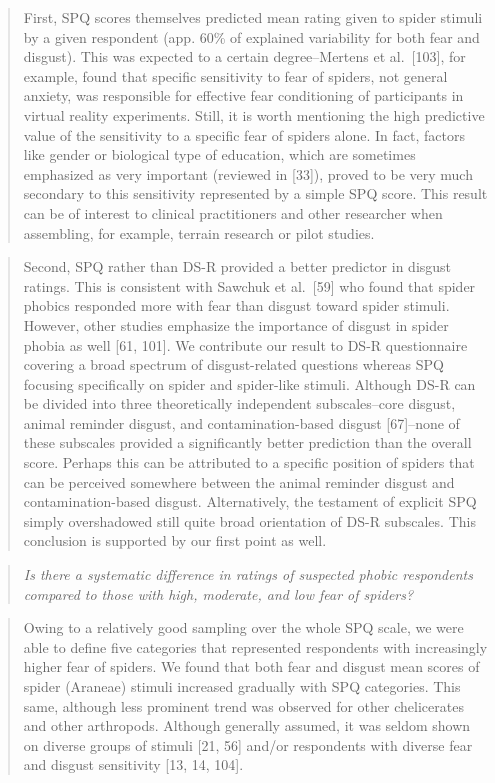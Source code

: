 \documentclass[
]{book}
\begin{document}
\begin{quote}
First, SPQ scores themselves predicted mean rating given to spider stimuli by a given respondent (app. 60\% of explained variability for both fear and disgust). This was expected to a certain degree--Mertens et al.~{[}103{]}, for example, found that specific sensitivity to fear of spiders, not general anxiety, was responsible for effective fear conditioning of participants in virtual reality experiments. Still, it is worth mentioning the high predictive value of the sensitivity to a specific fear of spiders alone. In fact, factors like gender or biological type of education, which are sometimes emphasized as very important (reviewed in {[}33{]}), proved to be very much secondary to this sensitivity represented by a simple SPQ score. This result can be of interest to clinical practitioners and other researcher when assembling, for example, terrain research or pilot studies.
\end{quote}

\begin{quote}
Second, SPQ rather than DS-R provided a better predictor in disgust ratings. This is consistent with Sawchuk et al.~{[}59{]} who found that spider phobics responded more with fear than disgust toward spider stimuli. However, other studies emphasize the importance of disgust in spider phobia as well {[}61, 101{]}. We contribute our result to DS-R questionnaire covering a broad spectrum of disgust-related questions whereas SPQ focusing specifically on spider and spider-like stimuli. Although DS-R can be divided into three theoretically independent subscales--core disgust, animal reminder disgust, and contamination-based disgust {[}67{]}--none of these subscales provided a significantly better prediction than the overall score. Perhaps this can be attributed to a specific position of spiders that can be perceived somewhere between the animal reminder disgust and contamination-based disgust. Alternatively, the testament of explicit SPQ simply overshadowed still quite broad orientation of DS-R subscales. This conclusion is supported by our first point as well.
\end{quote}

\begin{quote}
\emph{Is there a systematic difference in ratings of suspected phobic respondents compared to those with high, moderate, and low fear of spiders?}
\end{quote}

\begin{quote}
Owing to a relatively good sampling over the whole SPQ scale, we were able to define five categories that represented respondents with increasingly higher fear of spiders. We found that both fear and disgust mean scores of spider (Araneae) stimuli increased gradually with SPQ categories. This same, although less prominent trend was observed for other chelicerates and other arthropods. Although generally assumed, it was seldom shown on diverse groups of stimuli {[}21, 56{]} and/or respondents with diverse fear and disgust sensitivity {[}13, 14, 104{]}.
\end{quote}
\end{document}
